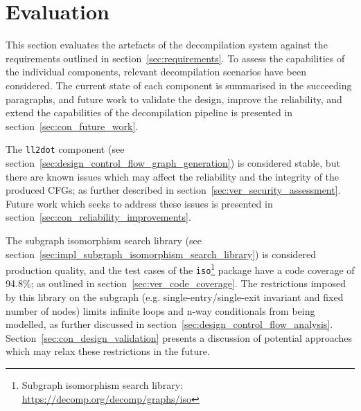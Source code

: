 
%

%
%

\section{Evaluation}
\label{sec:evaluation}

This section evaluates the artefacts of the decompilation system against the requirements outlined in section~\ref{sec:requirements}. To assess the capabilities of the individual components, relevant decompilation scenarios have been considered. The current state of each component is summarised in the succeeding paragraphs, and future work to validate the design, improve the reliability, and extend the capabilities of the decompilation pipeline is presented in section~\ref{sec:con_future_work}.

The \texttt{ll2dot} component (see section~\ref{sec:design_control_flow_graph_generation}) is considered stable, but there are known issues which may affect the reliability and the integrity of the produced CFGs; as further described in section~\ref{sec:ver_security_assessment}. Future work which seeks to address these issues is presented in section~\ref{sec:con_reliability_improvements}.

The subgraph isomorphism search library (see section~\ref{sec:impl_subgraph_isomorphism_search_library}) is considered production quality, and the test cases of the \texttt{iso}\footnote{Subgraph isomorphism search library: \url{https://decomp.org/decomp/graphs/iso}} package have a code coverage of 94.8\%; as outlined in section~\ref{sec:ver_code_coverage}. The restrictions imposed by this library on the subgraph (e.g. single-entry/single-exit invariant and fixed number of nodes) limits infinite loops and n-way conditionals from being modelled, as further discussed in section~\ref{sec:design_control_flow_analysis}. Section~\ref{sec:con_design_validation} presents a discussion of potential approaches which may relax these restrictions in the future.

